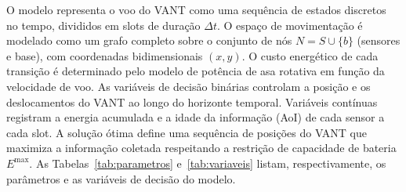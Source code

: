 \documentclass[
    12pt,
    oneside,
    a4paper,
    brazil
]{abntex2}
\begin{document}
O modelo representa o voo do VANT como uma sequência de estados discretos no tempo, divididos em slots de duração $\Delta t$. O espaço de movimentação é modelado como um grafo completo sobre o conjunto de nós $N = S \cup \{b\}$ (sensores e base), com coordenadas bidimensionais $(x, y)$. O custo energético de cada transição é determinado pelo modelo de potência de asa rotativa em função da velocidade de voo. As variáveis de decisão binárias controlam a posição e os deslocamentos do VANT ao longo do horizonte temporal. Variáveis contínuas registram a energia acumulada e a idade da informação (AoI) de cada sensor a cada slot. A solução ótima define uma sequência de posições do VANT que maximiza a informação coletada respeitando a restrição de capacidade de bateria $E^{\max}$. As Tabelas~\ref{tab:parametros} e~\ref{tab:variaveis} listam, respectivamente, os parâmetros e as variáveis de decisão do modelo.
\end{document}
